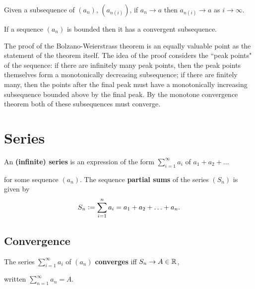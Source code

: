 \documentclass[../Year1.tex]{subfiles}
\begin{document}
\begin{theorem}
    Given a subsequence of $(a_n)$, $(a_{n(i)})$, if $a_n\rightarrow a$ then $a_{n(i)}\rightarrow a$ as $i\rightarrow\infty$.
\end{theorem}

\begin{theorem}
    If a sequence $(a_n)$ is bounded then it has a convergent subsequence.
\end{theorem}

\begin{note}
    The proof of the Bolzano-Weierstrass theorem is an equally valuable point as the statement of the theorem itself. The idea of the proof considers the ``peak points" of the sequence: if there are infinitely many peak points, then the peak points themselves form a monotonically decreasing subsequence; if there are finitely many, then the points after the final peak must have a monotonically increasing subsequence bounded above by the final peak. By the monotone convergence theorem both of these subsequences must converge.
\end{note}

\section{Series}

\begingroup\belowdisplayskip=-10pt
\begin{definition}
    An \textbf{(infinite) series} is an expression of the form $\displaystyle \sum_{i=1}^\infty a_i$ of $a_1 + a_2 + \ldots$ 
    
    \vspace{-8pt}
    for some sequence $(a_n)$. The sequence \textbf{partial sums} of the series $(S_n)$ is given by \[
        S_n := \sum_{i=1}^n a_i = a_1 + a_2 + \ldots + a_n
        \textcolor{black}{.}
    \]
\end{definition}
\endgroup

\subsection{Convergence}

\begin{definition}
    The series $\displaystyle \sum_{i=1}^\infty a_i$ of $(a_n)$ \textbf{converges} iff 
    $S_n\rightarrow A\in\mathbb{R}$, 
        
    \vspace{-10pt}
    written $\displaystyle\sum_{n=1}^\infty a_n=A$.
\end{definition}
\end{document}
